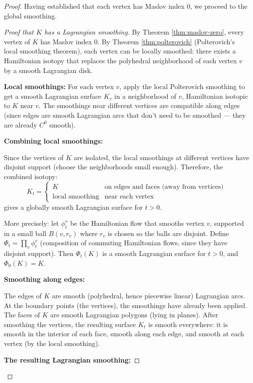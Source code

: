 \documentclass[12pt]{article}
\begin{document}
\begin{proof}
Having established that each vertex has Maslov index 0, we proceed to the global smoothing.

\begin{proof}[Proof that $K$ has a Lagrangian smoothing]
By Theorem \ref{thm:maslov-zero}, every vertex of $K$ has Maslov index 0. By Theorem \ref{thm:polterovich} (Polterovich's local smoothing theorem), each vertex can be locally smoothed: there exists a Hamiltonian isotopy that replaces the polyhedral neighborhood of each vertex $v$ by a smooth Lagrangian disk.

\textbf{Local smoothings:} For each vertex $v$, apply the local Polterovich smoothing to get a smooth Lagrangian surface $K_v$ in a neighborhood of $v$, Hamiltonian isotopic to $K$ near $v$. The smoothings near different vertices are compatible along edges (since edges are smooth Lagrangian arcs that don't need to be smoothed — they are already $C^0$ smooth).

\textbf{Combining local smoothings:}

Since the vertices of $K$ are isolated, the local smoothings at different vertices have disjoint support (choose the neighborhoods small enough). Therefore, the combined isotopy:
\[
K_t = \begin{cases} K & \text{on edges and faces (away from vertices)} \\ \text{local smoothing} & \text{near each vertex} \end{cases}
\]
gives a globally smooth Lagrangian surface for $t > 0$.

More precisely: let $\phi_t^v$ be the Hamiltonian flow that smooths vertex $v$, supported in a small ball $B(v, r_v)$ where $r_v$ is chosen so the balls are disjoint. Define $\Phi_t = \prod_v \phi_t^v$ (composition of commuting Hamiltonian flows, since they have disjoint support). Then $\Phi_t(K)$ is a smooth Lagrangian surface for $t > 0$, and $\Phi_0(K) = K$.

\textbf{Smoothing along edges:}

The edges of $K$ are smooth (polyhedral, hence piecewise linear) Lagrangian arcs. At the boundary points (the vertices), the smoothings have already been applied. The faces of $K$ are smooth Lagrangian polygons (lying in planes). After smoothing the vertices, the resulting surface $K_t$ is smooth everywhere: it is smooth in the interior of each face, smooth along each edge, and smooth at each vertex (by the local smoothing).

\textbf{The resulting Lagrangian smoothing:}


\end{proof}
\end{proof}
\end{document}
